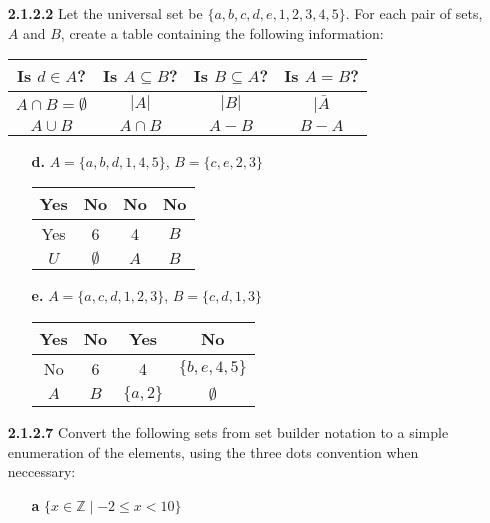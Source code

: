 \documentclass[10pt, a4paper]{article}
\begin{document}

\begin{itemize}
  \item[\textbf{2.1.2.2}] Let the universal set be $\{a,b,c,d,e,1,2,3,4,5\}$. For each pair of sets, $A$ and $B$, create a table
    containing the following information:

      \begin{tabular}{c | c | c | c}
        \hline
        Is $d \in A$? & Is $A \subseteq B$? & Is $B \subseteq A$? & Is $A = B$? \\ \hline
        $A \cap B = \emptyset$ & $|A|$ & $|B|$ & $|\bar{A}$ \\ \hline
        $A \cup B$ & $A \cap B$ & $A-B$ & $B-A$ \\ \hline
      \end{tabular}

    \begin{itemize}
      \item[\textbf{d.}] $A = \{a,b,d,1,4,5\}$, $B = \{c,e,2,3\}$
        
          \begin{tabular}{c | c | c | c}
            \hline
            Yes & No & No & No \\ \hline
            Yes & 6  & 4  & $B$ \\ \hline
            $U$ & $\emptyset$ & $A$ & $B$ \\ \hline
          \end{tabular}

        \item[\textbf{e.}] $A = \{a,c,d,1,2,3\}$, $B = \{c,d,1,3\}$

          \begin{tabular}{c | c | c | c}
            \hline
            Yes & No & Yes & No \\ \hline
            No  & 6  & 4   & $\{b,e,4,5\}$ \\ \hline
            $A$ & $B$ & $\{a,2\}$ & $\emptyset$ \\ \hline 
          \end{tabular}
    \end{itemize}

  \item[\textbf{2.1.2.7}] Convert the following sets from set builder notation to a simple enumeration of the elements, using
    the three dots convention when neccessary:
    \begin{itemize}
      \item[\textbf{a}] $ \{ x \in \mathbb{Z} \mid -2 \leq x < 10 \} $


\end{itemize}
\end{itemize}
\end{document}
